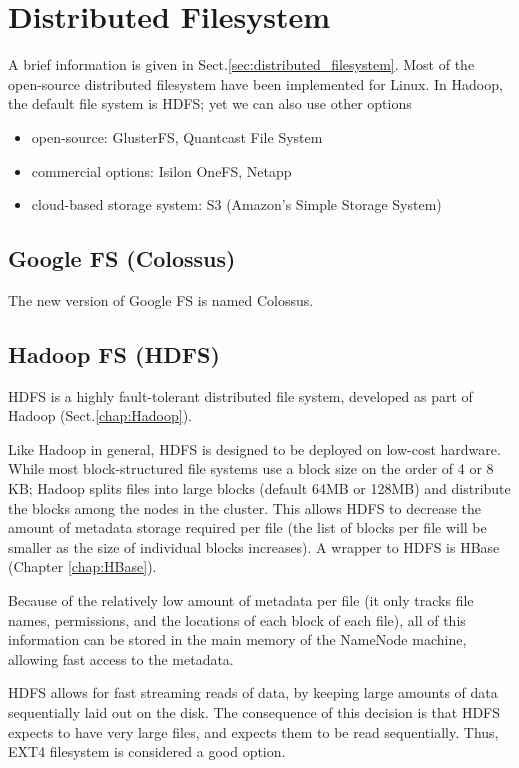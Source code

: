 \chapter{Distributed Filesystem}
\label{chap:distributed_filesystem}

A brief information is given in Sect.\ref{sec:distributed_filesystem}. Most of
the open-source distributed filesystem have been implemented for Linux.
In Hadoop, the default file system is HDFS; yet we can also use other options
\begin{itemize}
  \item open-source: GlusterFS, Quantcast File System
  \item commercial options: Isilon OneFS, Netapp
  \item cloud-based storage system: S3 (Amazon's Simple Storage System)
\end{itemize}

\section{Google FS (Colossus)}
\label{sec:GoogleFS}


The new version of Google FS is named Colossus. 


\section{Hadoop FS (HDFS)}
\label{sec:HadoopFS} 

HDFS is a highly fault-tolerant distributed file system, developed as
part of Hadoop (Sect.\ref{chap:Hadoop}).

Like Hadoop in general, HDFS is designed to be deployed on low-cost hardware.
While most block-structured file systems use a block size on the order of 4 or 8
KB; Hadoop splits files into large blocks (default 64MB or 128MB) and distribute
the blocks among the nodes in the cluster. This allows HDFS to decrease the
amount of metadata storage required per file (the list of blocks per file will
be smaller as the size of individual blocks increases).  A wrapper to HDFS is
HBase (Chapter \ref{chap:HBase}).

Because of the relatively low amount of metadata per file (it only tracks file
names, permissions, and the locations of each block of each file), all of this
information can be stored in the main memory of the NameNode machine, allowing
fast access to the metadata.

HDFS allows for fast streaming reads of data, by keeping large amounts of data
sequentially laid out on the disk. The consequence of this decision is that HDFS
expects to have very large files, and expects them to be read sequentially.
Thus, EXT4 filesystem is considered a good option.

